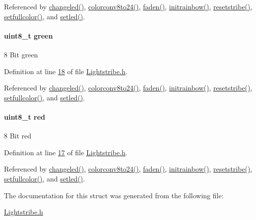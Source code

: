 Referenced by \hyperlink{_lightstribe_8c_source_l00033}{changeled()}, \hyperlink{_led_effects_8c_source_l00045}{colorconv8to24()}, \hyperlink{_led_effects_8c_source_l00366}{faden()}, \hyperlink{_led_effects_8c_source_l00442}{initrainbow()}, \hyperlink{_led_effects_8c_source_l00118}{resetstribe()}, \hyperlink{_led_effects_8c_source_l00096}{setfullcolor()}, and \hyperlink{_lightstribe_8c_source_l00051}{setled()}.

\hypertarget{structcolor24bit_a90d21fa503b626c00cdc8d94863d5877}{}
\paragraph[{green}]{\setlength{\rightskip}{0pt plus 5cm}uint8\+\_\+t green}\label{structcolor24bit_a90d21fa503b626c00cdc8d94863d5877}
8 Bit green 

Definition at line \hyperlink{_lightstribe_8h_source_l00018}{18} of file \hyperlink{_lightstribe_8h_source}{Lightstribe.\+h}.



Referenced by \hyperlink{_lightstribe_8c_source_l00033}{changeled()}, \hyperlink{_led_effects_8c_source_l00045}{colorconv8to24()}, \hyperlink{_led_effects_8c_source_l00366}{faden()}, \hyperlink{_led_effects_8c_source_l00442}{initrainbow()}, \hyperlink{_led_effects_8c_source_l00118}{resetstribe()}, \hyperlink{_led_effects_8c_source_l00096}{setfullcolor()}, and \hyperlink{_lightstribe_8c_source_l00051}{setled()}.

\hypertarget{structcolor24bit_ad47d918910aaa51c73160ac85999d09c}{}
\paragraph[{red}]{\setlength{\rightskip}{0pt plus 5cm}uint8\+\_\+t red}\label{structcolor24bit_ad47d918910aaa51c73160ac85999d09c}
8 Bit red 

Definition at line \hyperlink{_lightstribe_8h_source_l00017}{17} of file \hyperlink{_lightstribe_8h_source}{Lightstribe.\+h}.



Referenced by \hyperlink{_lightstribe_8c_source_l00033}{changeled()}, \hyperlink{_led_effects_8c_source_l00045}{colorconv8to24()}, \hyperlink{_led_effects_8c_source_l00366}{faden()}, \hyperlink{_led_effects_8c_source_l00442}{initrainbow()}, \hyperlink{_led_effects_8c_source_l00118}{resetstribe()}, \hyperlink{_led_effects_8c_source_l00096}{setfullcolor()}, and \hyperlink{_lightstribe_8c_source_l00051}{setled()}.



The documentation for this struct was generated from the following file\+:\begin{DoxyCompactItemize}
\item 
\hyperlink{_lightstribe_8h}{Lightstribe.\+h}\end{DoxyCompactItemize}
